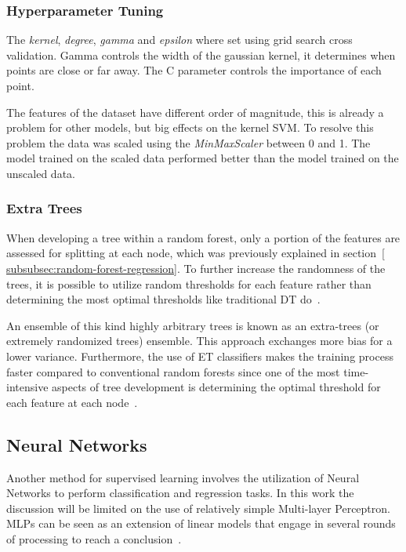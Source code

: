 \subsubsection*{Hyperparameter Tuning}
The \textit{kernel}, \textit{degree}, \textit{gamma} and \textit{epsilon}
where set using grid
search cross validation.
Gamma controls the width of the gaussian kernel, it determines when points
are close or far away.
The C parameter controls the importance of each point.

The features of the dataset have different order of magnitude, this is
already a problem for other
models, but big effects on the kernel \ac{SVM}.
To resolve this problem the data was scaled using the \textit{MinMaxScaler}
between 0 and 1.
The model trained on the scaled data performed better than the model trained
on the unscaled data.

\subsubsection{Extra Trees}\label{subsubsec:extra-trees}
When developing a tree within a random forest, only a portion of the features are
assessed for splitting at each node, which was previously explained in section~\ref{
    subsubsec:random-forest-regression}.
To further increase the randomness of the trees,
it is possible to utilize random thresholds for each feature rather than determining the
most optimal thresholds like traditional \ac{DT} do~\cite[p. 351]{geron2022hands}.

An ensemble of this kind highly arbitrary trees is known as an extra-trees (or extremely
randomized trees) ensemble.
This approach exchanges more bias for a lower variance.
Furthermore, the use of \ac{ET} classifiers makes the training process faster
compared to conventional random forests since one of the most time-intensive aspects of
tree development is determining the optimal threshold for each feature at
each node~\cite[p. 351]{geron2022hands}.

\subsection{Neural Networks}\label{subsec:neural-networks}
Another method for supervised learning involves the utilization of Neural Networks to
perform classification and regression tasks.
In this work the discussion will be limited on the use of relatively simple Multi-layer Perceptron.
MLPs can be seen as an extension of linear models that engage in several rounds of processing to
reach a conclusion~\cite[p. 104]{muller_introductionmachinelearning_2016}.

